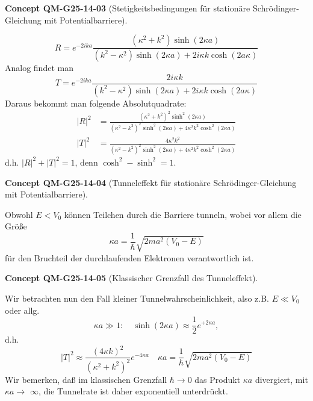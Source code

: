 \documentclass[10pt, letterpaper]{article}
\newcommand{\CustomHeading}[3]{%
  \par\medskip\noindent%
  \textbf{#1 #2} \textnormal{(#3)}.\enskip%
}
\newenvironment{CONC}[2]{\CustomHeading{Concept}{#1}{#2}}{}
\begin{document}
\begin{CONC}{QM-G25-14-03}{Stetigkeitsbedingungen für stationäre Schrödinger-Gleichung mit Potentialbarriere}
$$
R=e^{-2 i k a} \frac{\left(\kappa^{2}+k^{2}\right) \sinh (2 \kappa a)}{\left(k^{2}-\kappa^{2}\right) \sinh (2 \kappa a)+2 i \kappa k \cosh (2 a \kappa)}
$$
Analog findet man
$$
T=e^{-2 i k a} \frac{2 i \kappa k}{\left(k^{2}-\kappa^{2}\right) \sinh (2 \kappa a)+2 i \kappa k \cosh (2 a \kappa)}
$$
Daraus bekommt man folgende Absolutquadrate:
$$
\begin{aligned}
|R|^{2} & =\frac{\left(\kappa^{2}+k^{2}\right)^{2} \sinh ^{2}(2 \kappa a)}{\left(\kappa^{2}-k^{2}\right)^{2} \sinh ^{2}(2 \kappa a)+4 \kappa^{2} k^{2} \cosh ^{2}(2 \kappa a)} \\
|T|^{2} & =\frac{4 \kappa^{2} k^{2}}{\left(\kappa^{2}-k^{2}\right)^{2} \sinh ^{2}(2 \kappa a)+4 \kappa^{2} k^{2} \cosh ^{2}(2 \kappa a)}
\end{aligned}
$$
d.h. $|R|^{2}+|T|^{2}=1$, denn $\cosh ^{2}-\sinh ^{2}=1$.
\end{CONC}

\begin{CONC}{QM-G25-14-04}{Tunneleffekt für stationäre Schrödinger-Gleichung mit Potentialbarriere}
Obwohl $E<V_{0}$ können Teilchen durch die Barriere tunneln, wobei vor allem die Größe
$$
\kappa a=\frac{1}{\hbar} \sqrt{2 m a^{2}\left(V_{0}-E\right)}
$$
für den Bruchteil der durchlaufenden Elektronen verantwortlich ist.
\end{CONC}

\begin{CONC}{QM-G25-14-05}{Klassischer Grenzfall des Tunneleffekt}
Wir betrachten nun den Fall kleiner Tunnelwahrscheinlichkeit, also z.B. $E \ll V_{0}$ oder allg.
$$
\kappa a \gg 1: \quad \sinh (2 \kappa a) \approx \frac{1}{2} e^{+2 \kappa a},
$$
d.h.
$$
|T|^{2} \approx \frac{(4 \kappa k)^{2}}{\left(\kappa^{2}+k^{2}\right)^{2}} e^{-4 \kappa a} \quad \kappa a=\frac{1}{\hbar} \sqrt{2 m a^{2}\left(V_{0}-E\right)}
$$
Wir bemerken, daß im klassischen Grenzfall $\hbar \rightarrow 0$ das Produkt $\kappa a$ divergiert, mit $\kappa a \rightarrow$ $\infty$, die Tunnelrate ist daher exponentiell unterdrückt.
\end{CONC}
\end{document}

